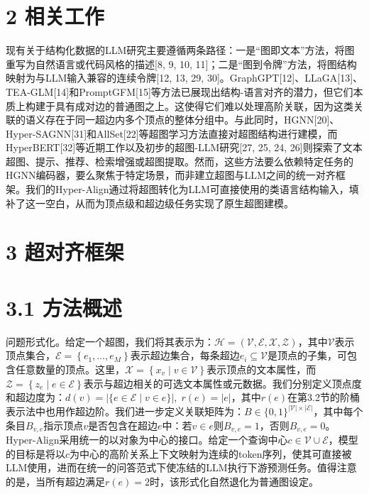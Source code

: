 \documentclass[10pt]{article}
\begin{document}
\section*{2 相关工作}

现有关于结构化数据的LLM研究主要遵循两条路径：一是“图即文本”方法，将图重写为自然语言或代码风格的描述[8, 9, 10, 11]；二是“图到令牌”方法，将图结构映射为与LLM输入兼容的连续令牌[12, 13, 29, 30]。GraphGPT[12]、LLaGA[13]、TEA-GLM[14]和PromptGFM[15]等方法已展现出结构-语言对齐的潜力，但它们本质上构建于具有成对边的普通图之上。这使得它们难以处理高阶关联，因为这类关联的语义存在于同一超边内多个顶点的整体分组中。与此同时，HGNN[20]、Hyper-SAGNN[31]和AllSet[22]等超图学习方法直接对超图结构进行建模，而HyperBERT[32]等近期工作以及初步的超图-LLM研究[27, 25, 24, 26]则探索了文本超图、提示、推荐、检索增强或超图提取。然而，这些方法要么依赖特定任务的HGNN编码器，要么聚焦于特定场景，而非建立超图与LLM之间的统一对齐框架。我们的Hyper-Align通过将超图转化为LLM可直接使用的类语言结构输入，填补了这一空白，从而为顶点级和超边级任务实现了原生超图建模。

\section*{3 超对齐框架}

\section*{3.1 方法概述}

问题形式化。给定一个超图，我们将其表示为：\(\mathcal{H} = \left( {\mathcal{V},\mathcal{E},\mathcal{X},\mathcal{Z}}\right)\)，其中\(\mathcal{V}\)表示顶点集合，\(\mathcal{E} = \left\{  {{e}_{1},\ldots ,{e}_{M}}\right\}\)表示超边集合，每条超边\({e}_{i} \subseteq  \mathcal{V}\)是顶点的子集，可包含任意数量的顶点。这里，\(\mathcal{X} = \left\{  {{x}_{v} \mid  v \in  \mathcal{V}}\right\}\)表示顶点的文本属性，而\(\mathcal{Z} = \left\{  {{z}_{e} \mid  e \in  \mathcal{E}}\right\}\)表示与超边相关的可选文本属性或元数据。我们分别定义顶点度和超边度为：\(d\left( v\right)  = \left| {\{ e \in  \mathcal{E} \mid  v \in  e\} }\right| ,\;r\left( e\right)  = \left| e\right|\)，其中\(r\left( e\right)\)在第3.2节的阶桶表示法中也用作超边阶。我们进一步定义关联矩阵为：\(B \in  \{ 0,1{\} }^{\left| \mathcal{V}\right|  \times  \left| \mathcal{E}\right| }\)，其中每个条目\({B}_{v,e}\)指示顶点\(v\)是否包含在超边\(e\)中：若\(v \in  e\)则\({B}_{v,e} = 1\)，否则\({B}_{v,e} = 0\)。Hyper-Align采用统一的以对象为中心的接口。给定一个查询中心\(c \in  \mathcal{V} \cup  \mathcal{E}\)，模型的目标是将以\(c\)为中心的高阶关系上下文映射为连续的token序列，使其可直接被LLM使用，进而在统一的问答范式下使冻结的LLM执行下游预测任务。值得注意的是，当所有超边满足\(r\left( e\right)  = 2\)时，该形式化自然退化为普通图设定。
\end{document}
